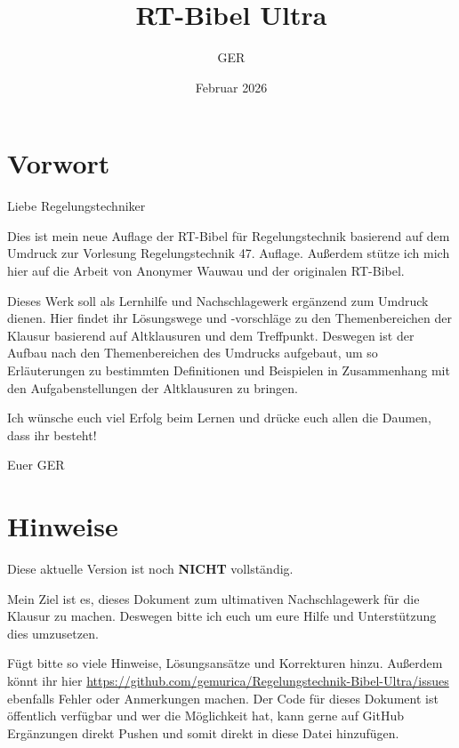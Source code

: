 \documentclass[12pt]{article}
\title{RT-Bibel Ultra}
\author{GER}
\date{Februar 2026}
\begin{document}
\maketitle
\clearpage

\section*{Vorwort}
Liebe Regelungstechniker

\vspace{0.8em}
\noindent Dies ist mein neue Auflage der RT-Bibel für Regelungstechnik basierend auf dem Umdruck zur Vorlesung Regelungstechnik 47. Auflage. 
Außerdem stütze ich mich hier auf die Arbeit von Anonymer Wauwau und der originalen RT-Bibel.

\vspace{0.8em}
\noindent Dieses Werk soll als Lernhilfe und Nachschlagewerk ergänzend zum Umdruck dienen. Hier findet ihr Lösungswege und -vorschläge zu den Themenbereichen der Klausur basierend auf Altklausuren und dem Treffpunkt.
Deswegen ist der Aufbau nach den Themenbereichen des Umdrucks aufgebaut, um so Erläuterungen zu bestimmten Definitionen und Beispielen in Zusammenhang mit den Aufgabenstellungen der Altklausuren zu bringen.

\vspace{0.8em}
\noindent Ich wünsche euch viel Erfolg beim Lernen und drücke euch allen die Daumen, dass ihr besteht!

\vspace{0.8em}
\noindent Euer GER
\section*{Hinweise}
\noindent Diese aktuelle Version ist noch \textbf{NICHT} vollständig. 

\vspace{0.8em}
\noindent Mein Ziel ist es, dieses Dokument zum ultimativen Nachschlagewerk für die Klausur zu machen. Deswegen bitte ich euch um eure Hilfe und Unterstützung dies umzusetzen.

\vspace{0.8em}
\noindent Fügt bitte so viele Hinweise, Lösungsansätze und Korrekturen hinzu. Außerdem könnt ihr hier \url{https://github.com/gemurica/Regelungstechnik-Bibel-Ultra/issues} ebenfalls Fehler oder Anmerkungen machen. Der Code für dieses Dokument ist öffentlich verfügbar und wer die Möglichkeit hat, kann gerne auf GitHub Ergänzungen direkt Pushen und somit direkt in diese Datei hinzufügen.
\end{document}
